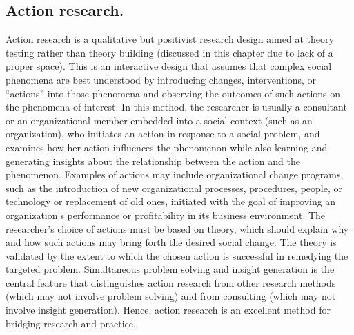 \subsection{Action research.} Action research is a qualitative but positivist research design aimed at theory testing rather than theory building (discussed in this chapter due to lack of a proper space). This is an interactive design that assumes that complex social phenomena are best understood by introducing changes, interventions, or “actions” into those phenomena and observing the outcomes of such actions on the phenomena of interest. In this method, the researcher is usually a consultant or an organizational member embedded into a social context (such as an organization), who initiates an action in response to a social problem, and examines how her action influences the phenomenon while also learning and generating insights about the relationship between the action and the phenomenon. Examples of actions may include organizational change programs, such as the introduction of new organizational processes, procedures, people, or technology or replacement of old ones, initiated with the goal of improving an organization’s performance or profitability in its business environment. The researcher’s choice of actions must be based on theory, which should explain why and how such actions may bring forth the desired social change. The theory is validated by the extent to which the chosen action is successful in remedying the targeted problem. Simultaneous problem solving and insight generation is the central feature that distinguishes action research from other research methods (which may not involve problem solving) and from consulting (which may not involve insight generation). Hence, action research is an excellent method for bridging research and practice.

